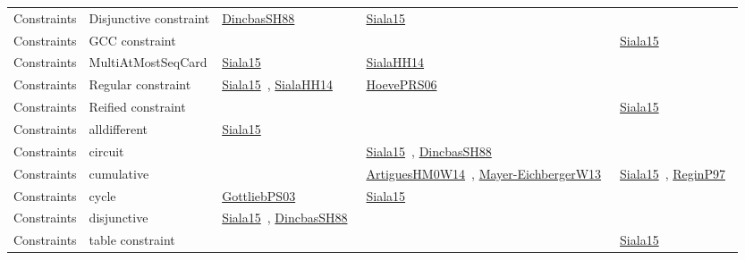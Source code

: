 {\begin{longtable}{lp{3cm}>{\raggedright\arraybackslash}p{6cm}>{\raggedright\arraybackslash}p{6cm}>{\raggedright\arraybackslash}p{8cm}}
Constraints & Disjunctive constraint & \href{../cars/works/DincbasSH88.pdf}{DincbasSH88}~\cite{DincbasSH88} & \href{../cars/works/Siala15.pdf}{Siala15}~\cite{Siala15} & \\
Constraints & GCC constraint &  &  & \href{../cars/works/Siala15.pdf}{Siala15}~\cite{Siala15}\\
Constraints & MultiAtMostSeqCard & \href{../cars/works/Siala15.pdf}{Siala15}~\cite{Siala15} & \href{../cars/works/SialaHH14.pdf}{SialaHH14}~\cite{SialaHH14} & \\
Constraints & Regular constraint & \href{../cars/works/Siala15.pdf}{Siala15}~\cite{Siala15}, \href{../cars/works/SialaHH14.pdf}{SialaHH14}~\cite{SialaHH14} & \href{../cars/works/HoevePRS06.pdf}{HoevePRS06}~\cite{HoevePRS06} & \\
Constraints & Reified constraint &  &  & \href{../cars/works/Siala15.pdf}{Siala15}~\cite{Siala15}\\
Constraints & alldifferent & \href{../cars/works/Siala15.pdf}{Siala15}~\cite{Siala15} &  & \\
Constraints & circuit &  & \href{../cars/works/Siala15.pdf}{Siala15}~\cite{Siala15}, \href{../cars/works/DincbasSH88.pdf}{DincbasSH88}~\cite{DincbasSH88} & \\
Constraints & cumulative &  & \href{../cars/works/ArtiguesHM0W14.pdf}{ArtiguesHM0W14}~\cite{ArtiguesHM0W14}, \href{../cars/works/Mayer-EichbergerW13.pdf}{Mayer-EichbergerW13}~\cite{Mayer-EichbergerW13} & \href{../cars/works/Siala15.pdf}{Siala15}~\cite{Siala15}, \href{../cars/works/ReginP97.pdf}{ReginP97}~\cite{ReginP97}\\
Constraints & cycle & \href{../cars/works/GottliebPS03.pdf}{GottliebPS03}~\cite{GottliebPS03} & \href{../cars/works/Siala15.pdf}{Siala15}~\cite{Siala15} & \\
Constraints & disjunctive & \href{../cars/works/Siala15.pdf}{Siala15}~\cite{Siala15}, \href{../cars/works/DincbasSH88.pdf}{DincbasSH88}~\cite{DincbasSH88} &  & \\
Constraints & table constraint &  &  & \href{../cars/works/Siala15.pdf}{Siala15}~\cite{Siala15}\\
\end{longtable}
}

